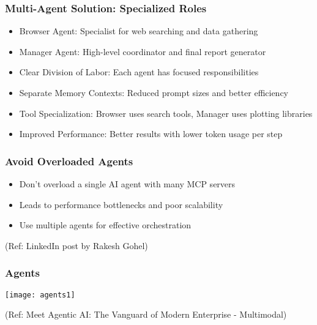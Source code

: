 \begin{frame}[fragile]\frametitle{Multi-Agent Solution: Specialized Roles}
      \begin{itemize}
		\item Browser Agent: Specialist for web searching and data gathering
		\item Manager Agent: High-level coordinator and final report generator
		\item Clear Division of Labor: Each agent has focused responsibilities
		\item Separate Memory Contexts: Reduced prompt sizes and better efficiency
		\item Tool Specialization: Browser uses search tools, Manager uses plotting libraries
		\item Improved Performance: Better results with lower token usage per step
	  \end{itemize}
\end{frame}




\begin{frame}[fragile]\frametitle{Avoid Overloaded Agents}
    \begin{itemize}
        \item Don't overload a single AI agent with many MCP servers
        \item Leads to performance bottlenecks and poor scalability
        \item Use multiple agents for effective orchestration
    \end{itemize}
	
{\tiny (Ref: LinkedIn post by Rakesh Gohel)}
	
\end{frame}

\begin{frame}[fragile]\frametitle{Agents}
	
	\begin{center}
	\texttt{[image: agents1]}
	\end{center}
	
{\tiny (Ref: Meet Agentic AI: The Vanguard of Modern Enterprise - Multimodal)}

\end{frame}


